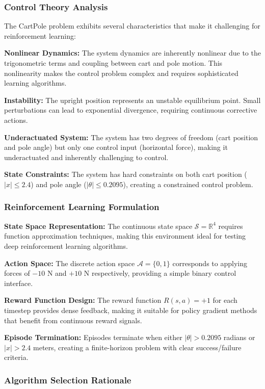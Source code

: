 \documentclass[12pt]{article}
\begin{document}
{{{\subsubsection{Control Theory Analysis}

The CartPole problem exhibits several characteristics that make it challenging for reinforcement learning:

\textbf{Nonlinear Dynamics:}
The system dynamics are inherently nonlinear due to the trigonometric terms and coupling between cart and pole motion. This nonlinearity makes the control problem complex and requires sophisticated learning algorithms.

\textbf{Instability:}
The upright position represents an unstable equilibrium point. Small perturbations can lead to exponential divergence, requiring continuous corrective actions.

\textbf{Underactuated System:}
The system has two degrees of freedom (cart position and pole angle) but only one control input (horizontal force), making it underactuated and inherently challenging to control.

\textbf{State Constraints:}
The system has hard constraints on both cart position ($|x| \leq 2.4$) and pole angle ($|\theta| \leq 0.2095$), creating a constrained control problem.

\subsubsection{Reinforcement Learning Formulation}

\textbf{State Space Representation:}
The continuous state space $\mathcal{S} = \mathbb{R}^4$ requires function approximation techniques, making this environment ideal for testing deep reinforcement learning algorithms.

\textbf{Action Space:}
The discrete action space $\mathcal{A} = \{0, 1\}$ corresponds to applying forces of $-10$ N and $+10$ N respectively, providing a simple binary control interface.

\textbf{Reward Function Design:}
The reward function $R(s,a) = +1$ for each timestep provides dense feedback, making it suitable for policy gradient methods that benefit from continuous reward signals.

\textbf{Episode Termination:}
Episodes terminate when either $|\theta| > 0.2095$ radians or $|x| > 2.4$ meters, creating a finite-horizon problem with clear success/failure criteria.

\subsubsection{Algorithm Selection Rationale}

}}}
\end{document}
